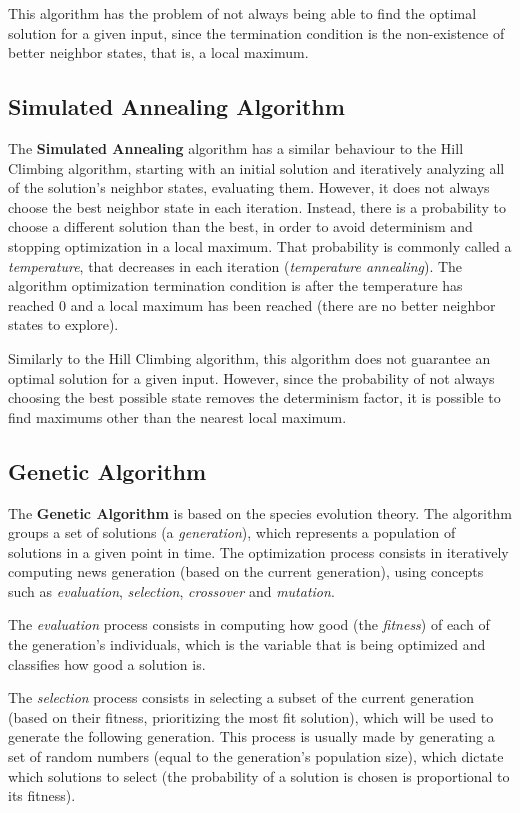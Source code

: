 \documentclass[conference]{IEEEtran}
\begin{document}
This algorithm has the problem of not always being able to find the optimal solution for a given input, since the termination condition is the non-existence of better neighbor states, that is, a local maximum.

\subsection{Simulated Annealing Algorithm}

The \textbf{Simulated Annealing} algorithm has a similar behaviour to the Hill Climbing algorithm, starting with an initial solution and iteratively analyzing all of the solution's neighbor states, evaluating them. However, it does not always choose the best neighbor state in each iteration. Instead, there is a probability to choose a different solution than the best, in order to avoid determinism and stopping optimization in a local maximum. That probability is commonly called a \textit{temperature}, that decreases in each iteration (\textit{temperature annealing}). The algorithm optimization termination condition is after the temperature has reached 0 and a local maximum has been reached (there are no better neighbor states to explore).

Similarly to the Hill Climbing algorithm, this algorithm does not guarantee an optimal solution for a given input. However, since the probability of not always choosing the best possible state removes the determinism factor, it is possible to find maximums other than the nearest local maximum.

\subsection{Genetic Algorithm}

The \textbf{Genetic Algorithm} is based on the species evolution theory. The algorithm groups a set of solutions (a \textit{generation}), which represents a population of solutions in a given point in time. The optimization process consists in iteratively computing news generation (based on the current generation), using concepts such as \textit{evaluation}, \textit{selection}, \textit{crossover} and \textit{mutation}. 

The \textit{evaluation} process consists in computing how good (the \textit{fitness}) of each of the generation's individuals, which is the variable that is being optimized and classifies how good a solution is.

The \textit{selection} process consists in selecting a subset of the current generation (based on their fitness, prioritizing the most fit solution), which will be used to generate the following generation. This process is usually made by generating a set of random numbers (equal to the generation's population size), which dictate which solutions to select (the probability of a solution is chosen is proportional to its fitness).
\end{document}
